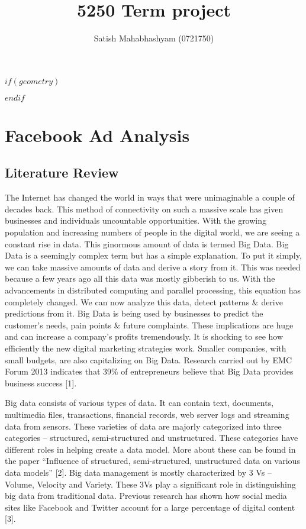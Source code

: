 \documentclass[
]{article}
\title{5250 Term project}
\author{Satish Mahabhashyam (0721750)}
\date{}
\begin{document}
\maketitle

\(if(geometry)\)

\usepackage[$for(geometry)$$geometry$$sep$,$endfor$]{geometry}

\(endif\)

\hypertarget{facebook-ad-analysis}{%
\section{Facebook Ad Analysis}\label{facebook-ad-analysis}}

\hypertarget{literature-review}{%
\subsection{Literature Review}\label{literature-review}}

The Internet has changed the world in ways that were unimaginable a
couple of decades back. This method of connectivity on such a massive
scale has given businesses and individuals uncountable opportunities.
With the growing population and increasing numbers of people in the
digital world, we are seeing a constant rise in data. This ginormous
amount of data is termed Big Data. Big Data is a seemingly complex term
but has a simple explanation. To put it simply, we can take massive
amounts of data and derive a story from it. This was needed because a
few years ago all this data was mostly gibberish to us. With the
advancements in distributed computing and parallel processing, this
equation has completely changed. We can now analyze this data, detect
patterns \& derive predictions from it. Big Data is being used by
businesses to predict the customer's needs, pain points \& future
complaints. These implications are huge and can increase a company's
profits tremendously. It is shocking to see how efficiently the new
digital marketing strategies work. Smaller companies, with small
budgets, are also capitalizing on Big Data. Research carried out by EMC
Forum 2013 indicates that 39\% of entrepreneurs believe that Big Data
provides business success {[}1{]}.

Big data consists of various types of data. It can contain text,
documents, multimedia files, transactions, financial records, web server
logs and streaming data from sensors. These varieties of data are
majorly categorized into three categories -- structured, semi-structured
and unstructured. These categories have different roles in helping
create a data model. More about these can be found in the paper
``Influence of structured, semi-structured, unstructured data on various
data models'' {[}2{]}. Big data management is mostly characterized by 3
Vs -- Volume, Velocity and Variety. These 3Vs play a significant role in
distinguishing big data from traditional data. Previous research has
shown how social media sites like Facebook and Twitter account for a
large percentage of digital content {[}3{]}.
\end{document}
